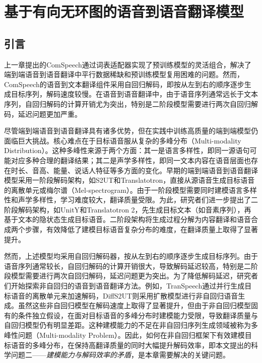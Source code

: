 \chapter{基于有向无环图的语音到语音翻译模型}\label{chap:daspeech}

\section{引言}

上一章提出的ComSpeech通过词表适配器实现了预训练模型的灵活组合，解决了端到端语音到语音翻译中平行数据稀缺和预训练模型复用困难的问题。然而，ComSpeech的语音到文本翻译组件采用自回归解码，即按从左到右的顺序逐步生成目标序列，解码速度较慢。在语音到语音翻译中，由于语音序列通常远长于文本序列，自回归解码的计算开销尤为突出，特别是二阶段模型需要进行两次自回归解码，延迟问题更加严重。

尽管端到端语音到语音翻译具有诸多优势，但在实践中训练高质量的端到端模型仍面临巨大挑战。核心难点在于目标语音服从复杂的多峰分布（Multi-modality Distribution）。这种多峰性来源于两个方面：其一是语言多样性，即同一源语句可能对应多种合理的翻译结果；其二是声学多样性，即同一文本内容在语音层面也存在时长、音高、能量、说话人特征等多方面的变化。早期的端到端语音到语音翻译模型采用一阶段解码架构，如S2UT\citep{s2ut}和Translatotron\citep{translatotron}，直接从源语音生成目标语音的离散单元或梅尔谱（Mel-spectrogram）。由于一阶段模型需要同时建模语言多样性和声学多样性，学习难度较大，翻译质量受限。为此，研究者们进一步提出了二阶段解码架构，如UnitY\citep{inaguma-etal-2023-unity}和Translatotron 2\citep{translatotron2}，先生成目标文本（如音素序列），再基于文本的隐状态生成目标语音。二阶段架构将生成过程分解为内容翻译和语音合成两个步骤，有效降低了建模目标语音复杂分布的难度，在翻译质量上取得了显著提升。

然而，上述模型均采用自回归解码器，按从左到右的顺序逐步生成目标序列。由于语音序列通常较长，自回归解码的计算开销很大，导致解码延迟较高，特别是二阶段模型需要进行两次自回归解码，延迟问题更为突出。为了降低解码延迟，研究者们开始探索非自回归的语音到语音翻译方法。例如，TranSpeech\citep{huang2023transpeech}通过并行生成目标语音的离散单元来加速解码，DiffS2UT\citep{diffs2ut}则采用扩散模型进行非自回归语音生成。虽然这些非自回归模型在解码速度上取得了显著提升，但由于非自回归模型固有的条件独立假设，在面对目标语音的多峰分布时建模能力受限，导致翻译质量与自回归模型仍有明显差距。这种建模能力的不足在非自回归序列生成领域被称为多峰性问题（Multi-modality Problem）\citep{gu2018nat}。因此，如何在非自回归框架下有效建模目标语音的多峰分布，在保持高翻译质量的同时大幅提升解码效率，即本文提出的科学问题二——\textit{建模能力与解码效率的矛盾}，是本章需要解决的关键问题。

